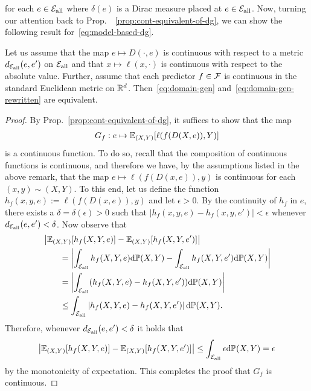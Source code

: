 \documentclass{article}
\begin{document}
for each $e\in{\mathcal{E}_\text{all}}$ where $\delta(e)$ is a Dirac measure placed at $e\in{\mathcal{E}_\text{all}}$.  Now, turning our attention back to Prop.\ ~\ref{prop:cont-equivalent-of-dg}, we can show the following result for~\eqref{eq:model-based-dg}.

\begin{remark} \label{rmk:model-based}
Let us assume that the map $e\mapsto D(\cdot, e)$ is continuous with respect to a metric $d_{{\mathcal{E}_\text{all}}}(e,e')$ on ${\mathcal{E}_\text{all}}$ and that $x\mapsto \ell(x,\cdot)$ is continuous with respect to the absolute value.  Further, assume that each predictor $f\in\mathcal{F}$ is continuous in the standard Euclidean metric on $\mathbb{R}^d$.  Then~\eqref{eq:domain-gen} and~\eqref{eq:domain-gen-rewritten} are equivalent.
\end{remark}

\begin{proof}
By Prop.~\ref{prop:cont-equivalent-of-dg}, it suffices to show that the map
%
\begin{align}
    G_f : e \mapsto \operatorname{\mathbb{E}}_{(X,Y)} [\ell(f(D(X,e)),Y)]
\end{align}
%
is a continuous function.  To do so, recall that the composition of continuous functions is continuous, and therefore we have, by the assumptions listed in the above remark, that the map $e\mapsto \ell(f(D(x,e)),y)$ is continuous for each $(x,y)\sim(X,Y)$.  To this end, let us define the function $h_f(x,y,e) := \ell(f(D(x,e)),y)$ and let $\epsilon>0$.  By the continuity of $h_f$ in $e$, there exists a $\delta=\delta(\epsilon) > 0$ such that $| h_f(x,y,e) - h_f(x,y,e')|<\epsilon$ whenever $d_{{\mathcal{E}_\text{all}}}(e,e') < \delta$.  Now observe that
%
\begin{align}
    &\left|\operatorname{\mathbb{E}}_{(X,Y)} [h_f(X,Y,e)] - \operatorname{\mathbb{E}}_{(X,Y)} [h_f(X,Y,e')]  \right| \\
    &\qquad = \left| \int_{{\mathcal{E}_\text{all}}} h_f(X,Y,e) \text{d}\mathbb{P}(X,Y) - \int_{{\mathcal{E}_\text{all}}} h_f(X,Y,e') \text{d}\mathbb{P}(X,Y) \right| \\
    &\qquad= \left| \int_{{\mathcal{E}_\text{all}}} (h_f(X,Y,e) - h_f(X,Y,e')) \text{d}\mathbb{P}(X,Y) \right| \\
    &\qquad\leq \int_{{\mathcal{E}_\text{all}}} \left| h_f(X,Y,e) - h_f(X,Y,e') \right| \text{d}\mathbb{P}(X,Y). \label{eq:last-inequal-continuity}
\end{align}
%
Therefore, whenever $d_{{\mathcal{E}_\text{all}}}(e,e')<\delta$ it holds that
%
\begin{align}
    \left|\operatorname{\mathbb{E}}_{(X,Y)} [h_f(X,Y,e)] - \operatorname{\mathbb{E}}_{(X,Y)} [h_f(X,Y,e')]  \right| \leq \int_{{\mathcal{E}_\text{all}}} \epsilon\text{d}\mathbb{P}(X,Y) = \epsilon
\end{align} 
%
by the monotonicity of expectation.  This completes the proof that $G_f$ is continuous.
\end{proof}
\end{document}
